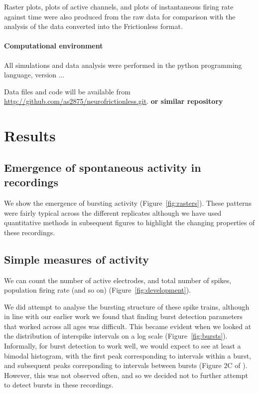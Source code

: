 \documentclass[doublespacing]{bmcart}
\begin{document}
\par Raster plots, plots of active channels, and plots of instantaneous firing rate against time were also produced from the raw data for comparison with the analysis of the data converted into the Frictionless format.


\paragraph{Computational environment} All simulations and data analysis were performed in the python programming
language, version ...

Data files and code will be available from
\url{http://github.com/as2875/neurofrictionless.git}. \textbf{or similar repository}

\section*{Results}

\subsection*{Emergence of spontaneous activity in recordings}
We show the emergence of bursting activity (Figure~\ref{fig:rasters}).  These patterns were fairly typical across the different replicates although we have used quantitative methods in subsequent figures to highlight the changing properties of these recordings.

\subsection*{Simple measures of activity}
We can count the number of active electrodes, and total number of
spikes, population firing rate (and so on)
(Figure~\ref{fig:development}).

We did attempt to analyse the bursting structure of these spike
trains, although in line with our earlier work \cite{Cotterill2016-qi}
we found that finding burst detection parameters that worked across
all ages was difficult.  This became evident when we looked at the
distribution of interspike intervals on a log scale
(Figure~\ref{fig:bursts}).  Informally, for burst detection to work
well, we would expect to see at least a bimodal histogram, with the
first peak corresponding to intervals within a burst, and subsequent
peaks correponding to intervals between bursts (Figure 2C of
\cite{Charlesworth2015-gv}).  However, this was not observed often,
and so we decided not to further attempt to detect bursts in these
recordings.
\end{document}
